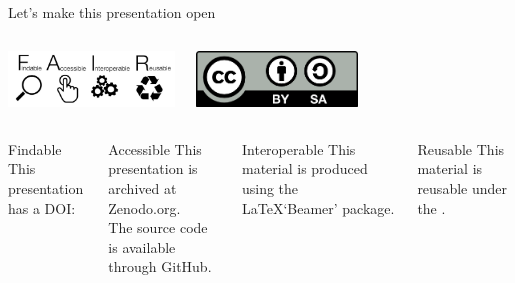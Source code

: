 \begin{frame}{Let's make this presentation open}

	\begin{columns}[t]
		\centering
		\includegraphics[height=1.5cm]{images/1280px-FAIR_data_principles.jpg}


		\centering
		\includegraphics[height=1.5cm]{images/cc-by-sa.png}

	\end{columns}

	\begin{columns}[t]
		\centering
		\begin{block}{Findable}
			This presentation has a DOI:
		\end{block}

		\begin{block}{Accessible}
			This presentation is archived at Zenodo.org. \\
			The source code is available through GitHub.
		\end{block}


		\centering
		\begin{block}{Interoperable}
			This material is produced using the \LaTeX\space `Beamer' package.
		\end{block}

		\begin{block}{Reusable}
			This material is reusable under the .
		\end{block}

	\end{columns}
\end{frame}